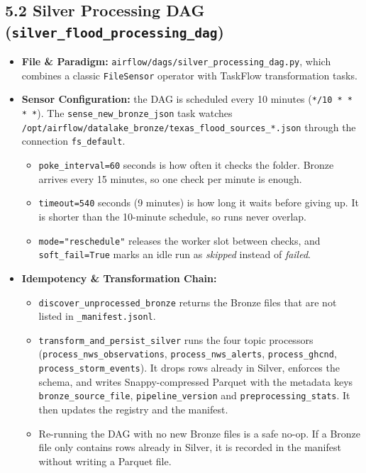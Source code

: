 \documentclass[stu, 12pt, letterpaper, donotrepeattitle, floatsintext, natbib]{apa7}
\begin{document}
\subsection{5.2 Silver Processing DAG (\texttt{silver\_flood\_processing\_dag})}
\begin{itemize}
    \item \textbf{File \& Paradigm:} \texttt{airflow/dags/silver\_processing\_dag.py}, which combines a classic \texttt{FileSensor} operator with TaskFlow transformation tasks.
    \item \textbf{Sensor Configuration:} the DAG is scheduled every 10 minutes (\texttt{*/10 * * * *}). The \texttt{sense\_new\_bronze\_json} task watches \texttt{/opt/airflow/datalake\_bronze/texas\_flood\_sources\_*.json} through the connection \texttt{fs\_default}.
    \begin{itemize}
        \item \texttt{poke\_interval=60} seconds is how often it checks the folder. Bronze arrives every 15 minutes, so one check per minute is enough.
        \item \texttt{timeout=540} seconds (9 minutes) is how long it waits before giving up. It is shorter than the 10-minute schedule, so runs never overlap.
        \item \texttt{mode="reschedule"} releases the worker slot between checks, and \texttt{soft\_fail=True} marks an idle run as \emph{skipped} instead of \emph{failed}.
    \end{itemize}
    \item \textbf{Idempotency \& Transformation Chain:}
    \begin{itemize}
        \item \texttt{discover\_unprocessed\_bronze} returns the Bronze files that are not listed in \texttt{\_manifest.jsonl}.
        \item \texttt{transform\_and\_persist\_silver} runs the four topic processors (\texttt{process\_nws\_observations}, \texttt{process\_nws\_alerts}, \texttt{process\_ghcnd}, \texttt{process\_storm\_events}). It drops rows already in Silver, enforces the schema, and writes Snappy-compressed Parquet with the metadata keys \texttt{bronze\_source\_file}, \texttt{pipeline\_version} and \texttt{preprocessing\_stats}. It then updates the registry and the manifest.
        \item Re-running the DAG with no new Bronze files is a safe no-op. If a Bronze file only contains rows already in Silver, it is recorded in the manifest without writing a Parquet file.
    \end{itemize}
\end{itemize}
\end{document}
